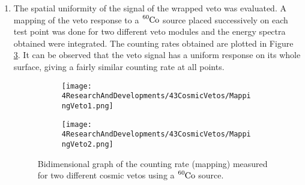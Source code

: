 \begin{enumerate}
\item{} The spatial uniformity of the signal of the wrapped veto was evaluated. A mapping of the veto response to a $\ce{^{60}Co}$ source placed successively on each test point was done for two different veto modules and the energy spectra obtained were integrated. The counting rates obtained are plotted in Figure \ref{fig:MappingVetos}. It can be observed that the veto signal has a uniform response on its whole surface, giving a fairly similar counting rate at all points.
\begin{figure}
\centering
    \begin{subfigure}[b]{0.9\textwidth}
    \centering
    \texttt{[image: 4ResearchAndDevelopments/43CosmicVetos/MappingVeto1.png]}  
    \caption{\label{subfig:MappingVeto1}}
    \end{subfigure}
    \hfill
    \begin{subfigure}[b]{0.9\textwidth}
    \centering
    \texttt{[image: 4ResearchAndDevelopments/43CosmicVetos/MappingVeto2.png]}  
    \caption{\label{subfig:MappingVeto2}}
    \end{subfigure}
 \caption{Bidimensional graph of the counting rate (mapping) measured for two different cosmic vetos using a $\ce{^{60}Co}$ source.}
 \label{fig:MappingVetos}
\end{figure}
\end{enumerate}

